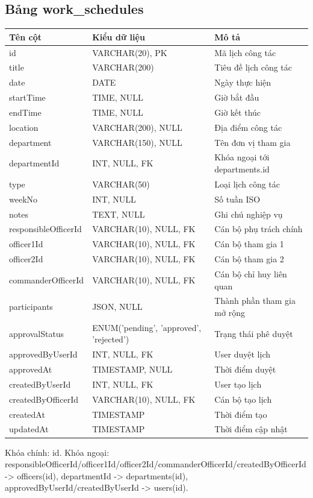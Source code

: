 \documentclass[18pt,a4paper]{report}
\begin{document}
\subsection{Bảng work\_schedules}
\begin{longtable}{|>{\raggedright\arraybackslash}p{4.5cm}|>{\raggedright\arraybackslash}p{4.5cm}|>{\raggedright\arraybackslash}p{6.5cm}|}
\hline
\textbf{Tên cột} & \textbf{Kiểu dữ liệu} & \textbf{Mô tả} \\ \hline
id & VARCHAR(20), PK & Mã lịch công tác \\ \hline
title & VARCHAR(200) & Tiêu đề lịch công tác \\ \hline
date & DATE & Ngày thực hiện \\ \hline
startTime & TIME, NULL & Giờ bắt đầu \\ \hline
endTime & TIME, NULL & Giờ kết thúc \\ \hline
location & VARCHAR(200), NULL & Địa điểm công tác \\ \hline
department & VARCHAR(150), NULL & Tên đơn vị tham gia \\ \hline
departmentId & INT, NULL, FK & Khóa ngoại tới departments.id \\ \hline
type & VARCHAR(50) & Loại lịch công tác \\ \hline
weekNo & INT, NULL & Số tuần ISO \\ \hline
notes & TEXT, NULL & Ghi chú nghiệp vụ \\ \hline
responsibleOfficerId & VARCHAR(10), NULL, FK & Cán bộ phụ trách chính \\ \hline
officer1Id & VARCHAR(10), NULL, FK & Cán bộ tham gia 1 \\ \hline
officer2Id & VARCHAR(10), NULL, FK & Cán bộ tham gia 2 \\ \hline
commanderOfficerId & VARCHAR(10), NULL, FK & Cán bộ chỉ huy liên quan \\ \hline
participants & JSON, NULL & Thành phần tham gia mở rộng \\ \hline
approvalStatus & ENUM('pending', 'approved', 'rejected') & Trạng thái phê duyệt \\ \hline
approvedByUserId & INT, NULL, FK & User duyệt lịch \\ \hline
approvedAt & TIMESTAMP, NULL & Thời điểm duyệt \\ \hline
createdByUserId & INT, NULL, FK & User tạo lịch \\ \hline
createdByOfficerId & VARCHAR(10), NULL, FK & Cán bộ tạo lịch \\ \hline
createdAt & TIMESTAMP & Thời điểm tạo \\ \hline
updatedAt & TIMESTAMP & Thời điểm cập nhật \\ \hline
\end{longtable}
Khóa chính: id. Khóa ngoại: responsibleOfficerId/officer1Id/officer2Id/commanderOfficerId/createdByOfficerId -> officers(id), departmentId -> departments(id), approvedByUserId/createdByUserId -> users(id).
\end{document}
